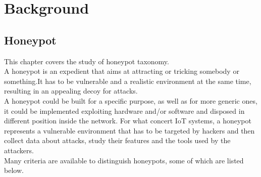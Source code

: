 \chapter{Background}
\section{Honeypot}
This chapter covers the study of honeypot taxonomy.\\
A honeypot is an expedient that aims at attracting or tricking somebody or something.It  has to be vulnerable and a realistic environment at the same time, resulting in an appealing decoy for attacks.\\
A honeypot could be built for a specific purpose, as well as for more generic ones, it could be implemented exploiting hardware and/or software and disposed in different position inside the network.
For what concert IoT systems, a honeypot represents a vulnerable environment that has to be targeted by hackers and then collect data about attacks, study their features and the tools used by the attackers. \\
Many criteria are available to distinguish honeypots, some of which are listed below. 

